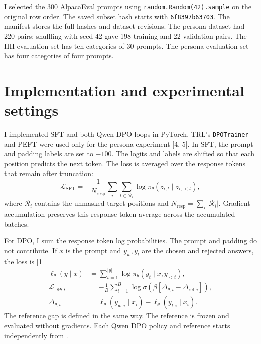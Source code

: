 \documentclass[11pt,a4paper]{article}
\newcommand{\code}[1]{\texttt{\small #1}}
\begin{document}
I selected the 300 AlpacaEval prompts using \code{random.Random(42).sample} on the original row order. The saved subset hash starts with \code{6f8397b63703}. The manifest stores the full hashes and dataset revisions. The persona dataset had 220 pairs; shuffling with seed 42 gave 198 training and 22 validation pairs. The HH evaluation set has ten categories of 30 prompts. The persona evaluation set has four categories of four prompts.

\section{Implementation and experimental settings}

I implemented SFT and both Qwen DPO loops in PyTorch. TRL's \code{DPOTrainer} and PEFT were used only for the persona experiment [4, 5]. In SFT, the prompt and padding labels are set to $-100$. The logits and labels are shifted so that each position predicts the next token. The loss is averaged over the response tokens that remain after truncation:
\begin{equation}
\mathcal{L}_{\mathrm{SFT}}
=-\frac{1}{N_{\mathrm{resp}}}
\sum_i\sum_{t\in\mathcal{R}_i}
\log\pi_\theta(z_{i,t}\mid z_{i,<t}),
\label{eq:sft}
\end{equation}
where $\mathcal{R}_i$ contains the unmasked target positions and $N_{\mathrm{resp}}=\sum_i|\mathcal{R}_i|$. Gradient accumulation preserves this response token average across the accumulated batches.

For DPO, I sum the response token log probabilities. The prompt and padding do not contribute. If $x$ is the prompt and $y_w,y_l$ are the chosen and rejected answers, the loss is [1]
\begin{align}
\ell_\theta(y\mid x)&=\sum_{t=1}^{|y|}\log\pi_\theta(y_t\mid x,y_{<t}),\\
\mathcal{L}_{\mathrm{DPO}}
&=-\frac{1}{B}\sum_{i=1}^{B}\log\sigma\!\left(\beta[\Delta_{\theta,i}-\Delta_{\mathrm{ref},i}]\right),
\label{eq:dpo}\\[-3pt]
\Delta_{\theta,i}&=\ell_\theta(y_{w,i}\mid x_i)-\ell_\theta(y_{l,i}\mid x_i).
\end{align}
The reference gap is defined in the same way. The reference is frozen and evaluated without gradients. Each Qwen DPO policy and reference starts independently from .
\end{document}
